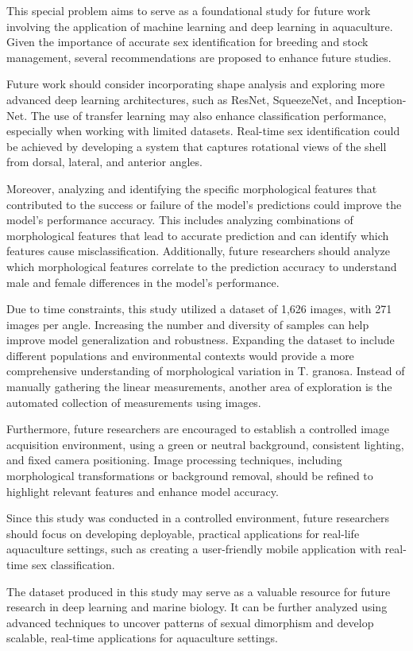 This special problem aims to serve as a foundational study for future work involving the application of machine learning and deep learning in aquaculture. Given the importance of accurate sex identification for breeding and stock management, several recommendations are proposed to enhance future studies. 

Future work should consider incorporating shape analysis and exploring more advanced deep learning architectures, such as ResNet, SqueezeNet, and Inception-Net. The use of transfer learning may also enhance classification performance, especially when working with limited datasets. Real-time sex identification could be achieved by developing a system that captures rotational views of the shell from dorsal, lateral, and anterior angles. 

Moreover, analyzing and identifying the specific morphological features that contributed to the success or failure of the model’s predictions could improve the model’s performance accuracy. This includes analyzing combinations of morphological features that lead to accurate prediction and can identify which features cause misclassification. Additionally, future researchers should analyze which morphological features correlate to the prediction accuracy to understand male and female differences in the model’s performance. 



Due to time constraints, this study utilized a dataset of 1,626 images, with 271 images per angle. Increasing the number and diversity of samples can help improve model generalization and robustness. Expanding the dataset to include different populations and environmental contexts would provide a more comprehensive understanding of morphological variation in T. granosa. Instead of manually gathering the linear measurements, another area of exploration is the automated collection of measurements using images. 

Furthermore, future researchers are encouraged to establish a controlled image acquisition environment, using a green or neutral background, consistent lighting, and fixed camera positioning. Image processing techniques, including morphological transformations or background removal, should be refined to highlight relevant features and enhance model accuracy. 

Since this study was conducted in a controlled environment, future researchers should focus on developing deployable, practical applications for real-life aquaculture settings, such as creating a user-friendly mobile application with real-time sex classification. 

The dataset produced in this study may serve as a valuable resource for future research in deep learning and marine biology. It can be further analyzed using advanced techniques to uncover patterns of sexual dimorphism and develop scalable, real-time applications for aquaculture settings.
